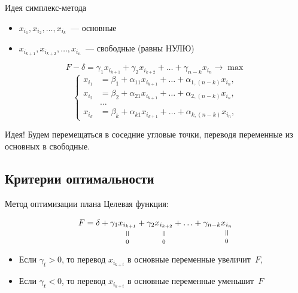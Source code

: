 \documentclass[unicode,11pt,notheorems]{beamer}
\newcommand{\verteq}{\rotatebox{90}{$\,=$}}
\newcommand{\equalto}[2]{\underset{\scriptstyle\overset{\mkern4mu\verteq}{#2}}{#1}}
\begin{document}
\begin{frame}{Идея симплекс-метода}{}

\begin{itemize}
\item $x_{i_1}, x_{i_2},\ldots,x_{i_k}$~--- основные
\item $x_{i_{k+1}}, x_{i_{k+2}},\ldots,x_{i_{n}}$~--- свободные (\alert{равны НУЛЮ})
\end{itemize}

$$
  F- \delta = \gamma_1 x_{i_{k+1}}+\gamma_2 x_{i_{k+2}}+\ldots+\gamma_{n-k} x_{i_n} \to \max
  $$
  $$
\left\lbrace
  \begin{aligned}
  x_{i_1} &= \beta_1 + \alpha_{11} x_{i_{k+1}} + \ldots + \alpha_{1,(n-k)} x_{i_n},\\
  x_{i_2} &= \beta_2 + \alpha_{21} x_{i_{k+1}} + \ldots + \alpha_{2,(n-k)} x_{i_n},\\
  &\ldots\\
  x_{i_k} &= \beta_k + \alpha_{k1} x_{i_{k+1}} + \ldots + \alpha_{k,(n-k)} x_{i_n},
  \end{aligned}
  \right.
  $$

\begin{alertblock}{Идея!}
Будем перемещаться в соседние угловые точки, переводя переменные из основных в свободные.
\end{alertblock}
\end{frame}   

\subsection{Критерии оптимальности}

\begin{frame}{Метод оптимизации плана}{}
Целевая функция: 

$$
  F=\delta+\gamma_1 \equalto{x_{i_{k+1}}}{0}+\gamma_2 \equalto{x_{i_{k+2}}}{0}+\ldots+\gamma_{n-k} \equalto{x_{i_{n}}}{0}
$$
\begin{itemize}
\item Если \alert{$\gamma_t>0$}, то перевод $x_{i_{k+t}}$ в основные  переменные \alert{увеличит}~$F$,

\item Если \alert{$\gamma_t<0$}, то перевод $x_{i_{k+t}}$ в основные  переменные \alert{уменьшит}~$F$
\end{itemize}
\end{frame}  
\end{document}
